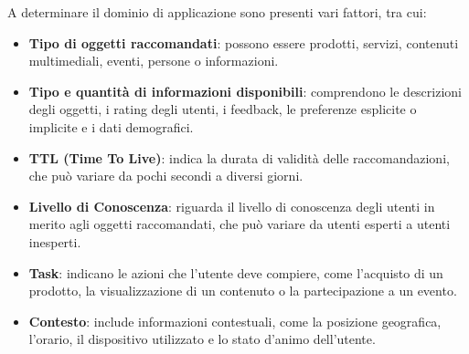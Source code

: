 \documentclass{report}
\begin{document}
	A determinare il dominio di applicazione sono presenti vari fattori, tra cui:
	\begin{itemize}
		\item \textbf{Tipo di oggetti raccomandati}: possono essere prodotti, servizi, contenuti multimediali, eventi, persone o informazioni.
		\item \textbf{Tipo e quantità di informazioni disponibili}: comprendono le descrizioni degli oggetti, i rating degli utenti, i feedback, le preferenze esplicite o implicite e i dati demografici.
		\item \textbf{TTL (Time To Live)}: indica la durata di validità delle raccomandazioni, che può variare da pochi secondi a diversi giorni.
		\item \textbf{Livello di Conoscenza}: riguarda il livello di conoscenza degli utenti in merito agli oggetti raccomandati, che può variare da utenti esperti a utenti inesperti.
		\item \textbf{Task}: indicano le azioni che l'utente deve compiere, come l'acquisto di un prodotto, la visualizzazione di un contenuto o la partecipazione a un evento.
		\item \textbf{Contesto}: include informazioni contestuali, come la posizione geografica, l'orario, il dispositivo utilizzato e lo stato d'animo dell'utente.
	\end{itemize}
\end{document}
